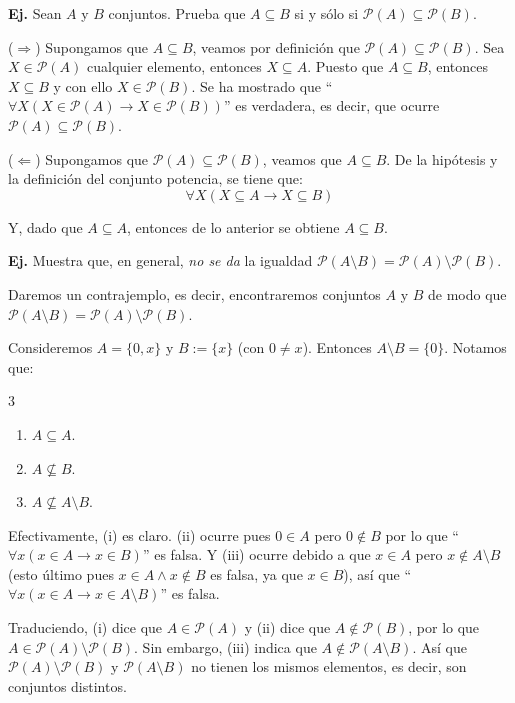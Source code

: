 \documentclass[letterpaper,DIV=14,headsepline,12pt]{scrartcl}
\makeatletter
\newcounter{Ejer}
\newcommand{\pts}{}
\newenvironment{ejercicio}[1]{\noindent
    \ifthenelse{\equal{#1}{1} \OR \equal{#1}{+1}}{\renewcommand{\pts}{\textbf{(#1 pt)}}}{\renewcommand{\pts}{\textbf{(#1 pts)}}}\textbf{Ej. \theEjer} \pts\stepcounter{Ejer}}{\vspace{.3cm}}
\renewenvironment{proof}[1][]{%
        \par\pushQED{\qed}%
        \normalfont\topsep6pt \partopsep0pt %
        \trivlist
        \item[\hskip\labelsep
                \textbf{\textit{Demostración.}}%
        ]#1
        }{%
        \popQED\endtrivlist\@endpefalse
    }
\newenvironment{solu}[1][]{%
        \par\pushQED{\hfill \lozenge}%
        \normalfont\topsep6pt \partopsep0pt %
        \trivlist
        \item[\hskip\labelsep
                \textbf{\textit{Solución.}}%
        ]#1
        }{%
        \popQED\endtrivlist\@endpefalse
    }
\makeatother
\begin{document}
    \begin{ejercicio}{1}
        Sean $A$ y $B$ conjuntos. Prueba que $A \subseteq B$ si y sólo si $\mathscr{P}(A) \subseteq \mathscr{P}(B)$.
    \end{ejercicio}
    \begin{proof}
        ($\Rightarrow$) Supongamos que $A \subseteq B$, veamos por definición que $\mathscr{P}(A) \subseteq \mathscr{P}(B)$. Sea $X \in \mathscr{P}(A)$ cualquier elemento, entonces $X \subseteq A$. Puesto que $A \subseteq B$, entonces $X \subseteq B$ y con ello $X \in \mathscr{P}(B)$. Se ha mostrado que ``$ \forall X (X \in \mathscr{P}(A) \to X \in \mathscr{P}(B)) $'' es verdadera, es decir, que ocurre $\mathscr{P}(A) \subseteq \mathscr{P}(B)$.

        ($\Leftarrow$) Supongamos que $\mathscr{P}(A) \subseteq \mathscr{P}(B)$, veamos que $A \subseteq B$. De la hipótesis y la definición del conjunto potencia, se tiene que:
        \[ \forall X (X \subseteq A \to X \subseteq B ) \]
        
        Y, dado que $A \subseteq A$, entonces de lo anterior se obtiene $A \subseteq B$.
    \end{proof}

    \begin{ejercicio}{1}
        Muestra que, en general, \textit{no se da} la igualdad $\mathscr{P}(A \setminus B) = \mathscr{P}(A) \setminus \mathscr{P}(B)$.
    \end{ejercicio}
    \begin{solu}
        Daremos un contrajemplo, es decir, encontraremos conjuntos $A$ y $B$ de modo que $\mathscr{P}(A \setminus B) = \mathscr{P}(A) \setminus \mathscr{P}(B)$.

        Consideremos $A=\{0,x\}$ y $B:=\{x\}$ (con $0\neq x$). Entonces $A \setminus B=\{0\}$. Notamos que:
        \begin{multicols}{3}
            \begin{enumerate}
                \item $A \subseteq A$.
                \item $A \not\subseteq B$.
                \item $A \not\subseteq A \setminus B$.
            \end{enumerate}
        \end{multicols}
        Efectivamente, (i) es claro. (ii) ocurre pues $0 \in A$ pero $0 \notin B$ por lo que ``$\forall x (x \in A \to x \in B)$'' es falsa. Y (iii) ocurre debido a que $x \in A$ pero $x \notin A \setminus B$ (esto último pues $x \in A \land x \notin B$ es falsa, ya que $x \in B$), así que ``$\forall x (x \in A \to x \in A \setminus B)$'' es falsa.

        Traduciendo, (i) dice que $A \in \mathscr{P}(A)$ y (ii) dice que $A \notin \mathscr{P}(B)$, por lo que $A \in \mathscr{P}(A) \setminus \mathscr{P}(B)$. Sin embargo, (iii) indica que $A \notin \mathscr{P}(A \setminus B)$. Así que $\mathscr{P}(A) \setminus \mathscr{P}(B)$ y $\mathscr{P}(A \setminus B)$ no tienen los mismos elementos, es decir, son conjuntos distintos.
    \end{solu}
\end{document}

